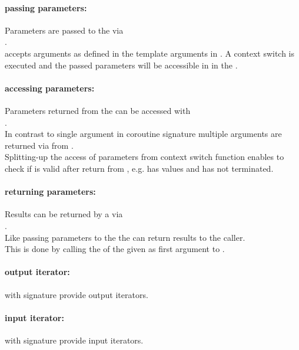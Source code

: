 \paragraph*{passing parameters:}
Parameters are passed to the \corofunction via\\\coroop.\\
\newline
\coroop accepts arguments as defined in the template arguments in \coro. A
context switch is executed and the passed parameters will be accessible in in
the \corofunction.

\paragraph*{accessing parameters:}
Parameters returned from the \corofunction can be accessed with\\\coroget.\\
\newline
In contrast to single argument in coroutine signature multiple arguments are
returned via \tuple from \coroget.\\
Splitting-up the access of parameters from context switch function enables to
check if \coro is valid after return from \coroop, e.g. \coro has values and
\corofunction has not terminated.

\paragraph*{returning parameters:}
Results can be returned by a \corofunction via\\\coroop.\\
\newline
Like passing parameters to the \corofunction the \corofunction can return
results to the caller.\\ This is done by calling the \coroop of the \coro given
as first argument to \corofunction.

\paragraph*{output iterator:}
\coro with signature  provide output iterators.

\paragraph*{input iterator:}
\coro with signature  provide input iterators.

